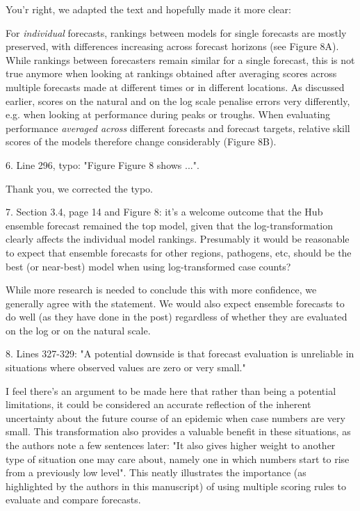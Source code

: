 \documentclass{article}
\newcommand{\black}{\color{black}}
\newcommand{\blue}{\color{blue}}
\newcommand{\indented}{\setlength{\leftskip}{1cm}}
\newcommand{\notindented}{\setlength{\leftskip}{0cm}}
\begin{document}
\black
You'r right, we adapted the text and hopefully made it more clear: 

\indented

For \textit{individual} forecasts, rankings between models for single forecasts are mostly preserved, with differences increasing across forecast horizons (see Figure 8A). While rankings between forecasters remain similar for a single forecast, this is not true anymore when looking at rankings obtained after averaging scores across multiple forecasts made at different times or in different locations. As discussed earlier, scores on the natural and on the log scale penalise errors very differently, e.g. when looking at performance during peaks or troughs. When evaluating performance \textit{averaged across} different forecasts and forecast targets, relative skill scores of the models therefore change considerably (Figure 8B).

\notindented

\blue
6. Line 296, typo: "Figure Figure 8 shows ...".

\black
Thank you, we corrected the typo. 

\blue
7. Section 3.4, page 14 and Figure 8: it's a welcome outcome that the Hub ensemble forecast remained the top model, given that the log-transformation clearly affects the individual model rankings. Presumably it would be reasonable to expect that ensemble forecasts for other regions, pathogens, etc, should be the best (or near-best) model when using log-transformed case counts?

\black
While more research is needed to conclude this with more confidence, we generally agree with the statement. We would also expect ensemble forecasts to do well (as they have done in the post) regardless of whether they are evaluated on the log or on the natural scale. 

\blue
8. Lines 327-329: "A potential downside is that forecast evaluation is unreliable in situations where observed values are zero or very small."

I feel there's an argument to be made here that rather than being a potential limitations, it could be considered an accurate reflection of the inherent uncertainty about the future course of an epidemic when case numbers are very small. This transformation also provides a valuable benefit in these situations, as the authors note a few sentences later: "It also gives higher weight to another type of situation one may care about, namely one in which numbers start to rise from a previously low level". This neatly illustrates the importance (as highlighted by the authors in this manuscript) of using multiple scoring rules to evaluate and compare forecasts.
\end{document}

